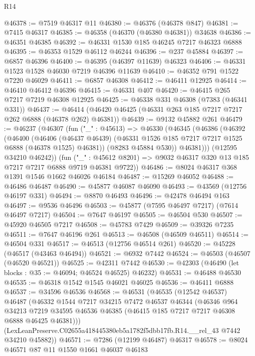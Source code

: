 \begin{lexlean}{R14}
\begin{coremodule}
@46378 := @7519 @46317 @11
@46380 := @46376 (@46378 @847)
@46381 := @7415 @46317
@46385 := @46358 (@46370 (@46380 @46381)) @34638
@46386 := @46351 @46385
@46392 := @46331 @1530 @185 @46245 @7217 @46323 @6888
@46395 := @46353 @1529 @46112 @46244
@46396 := @237 @45884
@46397 := @6857 @46396
@46400 := @46395 (@46397 @11639) @46323
@46406 := @46331 @1523 @1528 @46030 @7219 @46396 @11639
@46410 := @46352 @791 @1522 @7220 @46029
@46411 := @6857 @46308
@46412 := @46411 @12925
@46414 := @46410 @46412 @46396
@46415 := @46331 @407
@46420 := @46415 @265 @7217 @7219 @46308 @12925
@46425 := @46338 @331 @46308 (@7383 (@46341 @331))
@46437 := @46414 (@46420 @46425 (@46331 @263 @185 @7217 @7217 @262 @6888 (@46378 @262) @46381))
@46439 := @9132 @45882 @261
@46479 := @46237
    (@46307
      (fun ("_" : @45613) =>
      @46330
        (@46345
          (@46386
            (@46392
              (@46400
                (@46406
                  (@46437 @46439)
                  (@46331 @1526 @185 @7217 @7217 @1525 @6888 (@46378 @1525) @46381))
                (@8283 @45884 @530))
              @46381)))
        (@12595 @34210 @46242))
      (fun ("_" : @45612 @8201) => @9032 @46317 @320 @13 @185 @7217 @7217 @6888 @9719 @46381 @9722))
@46486 := @8024 @46317 @368 @1391 @1546 @1662 @46026 @46184
@46487 := @15269 @46052
@46488 := @46486 @46487
@46490 := @45877 @46087 @46090
@46493 := @43569 (@12756 @46197 @331)
@46494 := @8870 @46493
@46496 := @42478 @46494 @163
@46497 := @9536 @46496
@46503 := @45877 (@7595 @46497 @7217) (@7614 @46497 @7217)
@46504 := @7647 @46197
@46505 := @46504 @530
@46507 := @45920 @46505 @7217
@46508 := @45783 @7429
@46509 := @39326 @7235
@46511 := @7647 @46196 @261
@46513 := @46508 (@46509 @46511)
@46514 := @46504 @331
@46517 := @46513 (@12756 @46514 @261)
@46520 := @45228 (@46517 (@43463 @46494))
@46521 := @6932 @7442
@46524 := @46503 (@46507 (@46520 @46521))
@46525 := @42311 @7442
@46530 := @42303 (@46490 (let blocks : @35 := @46094; @46524 @46525) @46232)
@46531 := @46488 @46530
@46535 := @46318 @1542 @1545 @46021 @46025
@46536 := @46411 @6888
@46537 := @34596 @46536
@46568 := @46531
    (@46535
      (@12542 @46537)
      @46487
      (@46332
        @1544
        @7217
        @34215
        @7472
        @46537
        @46344
        (@46346
          @964
          @34213
          @7219
          @34595
          @46536
          @46385
          (@46415 @185 @7217 @7217 @46308 @6888 @46425 @46381)))
      (LexLeanPreserve.C02655a418445380eb5a1782f5dbb17fb.R14.__rel_43 @7442 @34210 @45882))
@46571 := @7286 (@12199 @46487) @46317
@46578 := @8024 @46571 @87 @11 @1550 @1661 @46037 @46183

\end{coremodule}
\end{lexlean}
